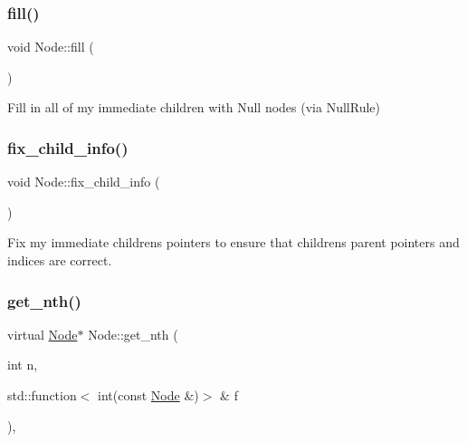 \mbox{\label{class_node_a1c03973664fcfdfb191feb67f565168b}} 
\subsubsection{\texorpdfstring{fill()}{fill()}}
{\footnotesize\ttfamily void Node\+::fill (\begin{DoxyParamCaption}{ }\end{DoxyParamCaption})\hspace{0.3cm}{\ttfamily [inline]}}

Fill in all of my immediate children with Null nodes (via Null\+Rule)\mbox{\label{class_node_a8f25f44608c0b19fe02eaf19ade9ea68}} 
\subsubsection{\texorpdfstring{fix\+\_\+child\+\_\+info()}{fix\_child\_info()}}
{\footnotesize\ttfamily void Node\+::fix\+\_\+child\+\_\+info (\begin{DoxyParamCaption}{ }\end{DoxyParamCaption})\hspace{0.3cm}{\ttfamily [inline]}}

Fix my immediate children\textquotesingle{}s pointers to ensure that children\textquotesingle{}s parent pointers and indices are correct.\mbox{\label{class_node_a93fc84b584f080593978d3a39631d3e5}} 
\subsubsection{\texorpdfstring{get\+\_\+nth()}{get\_nth()}\hspace{0.1cm}{\footnotesize\ttfamily [1/2]}}
{\footnotesize\ttfamily virtual \hyperlink{class_node}{Node}$\ast$ Node\+::get\+\_\+nth (\begin{DoxyParamCaption}\item[{int}]{n,  }\item[{std\+::function$<$ int(const \hyperlink{class_node}{Node} \&)$>$ \&}]{f }\end{DoxyParamCaption})\hspace{0.3cm}{\ttfamily [inline]}, {\ttfamily [virtual]}}

